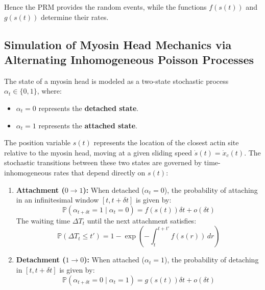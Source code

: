 \documentclass{article}
\begin{document}
Hence the PRM provides the random events, while the functions
$f(s(t))$ and $g(s(t))$ determine their rates.


\subsection{Simulation of Myosin Head Mechanics via Alternating Inhomogeneous Poisson Processes}

The state of a myosin head is modeled as a two-state stochastic process $\alpha_t \in \{0, 1\}$, where:
\begin{itemize}
    \item $\alpha_t = 0$ represents the \textbf{detached state}.
    \item $\alpha_t = 1$ represents the \textbf{attached state}.
\end{itemize}

The position variable $s(t)$ represents the location of the closest actin site relative to the myosin head, moving at a given sliding speed $\dot{s}(t) = \dot{x}_c(t)$. The stochastic transitions between these two states are governed by time-inhomogeneous rates that depend directly on $s(t)$:

\begin{enumerate}
    \item \textbf{Attachment ($0 \rightarrow 1$):} When detached ($\alpha_t = 0$), the probability of attaching in an infinitesimal window $[t, t + \delta t]$ is given by:
    \begin{equation}
        \mathbb{P}(\alpha_{t+\delta t} = 1 \mid \alpha_t = 0) = f(s(t))\delta t + o(\delta t)
    \end{equation}
    The waiting time $\Delta T_t$ until the next attachment satisfies:
    \begin{equation}
        \mathbb{P}(\Delta T_t \leq t') = 1 - \exp\left( -\int_{t}^{t+t'} f(s(r)) \, dr \right)
    \end{equation}

    \item \textbf{Detachment ($1 \rightarrow 0$):} When attached ($\alpha_t = 1$), the probability of detaching in $[t, t + \delta t]$ is given by:
    \begin{equation}
        \mathbb{P}(\alpha_{t+\delta t} = 0 \mid \alpha_t = 1) = g(s(t))\delta t + o(\delta t)
    \end{equation}
\end{enumerate}
\end{document}
